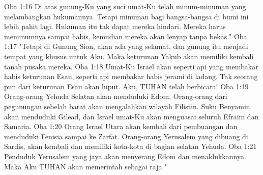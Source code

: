 Oba 1:16  Di atas gunung-Ku yang suci umat-Ku telah minum-minuman yang melambangkan hukumannya. Tetapi minuman bagi bangsa-bangsa di bumi ini lebih pahit lagi. Hukuman itu tak dapat mereka hindari. Mereka harus meminumnya sampai habis, kemudian mereka akan lenyap tanpa bekas."
Oba 1:17  "Tetapi di Gunung Sion, akan ada yang selamat, dan gunung itu menjadi tempat yang khusus untuk Aku. Maka keturunan Yakub akan memiliki kembali tanah pusaka mereka.
Oba 1:18  Umat-Ku Israel akan seperti api yang membakar habis keturunan Esau, seperti api membakar habis jerami di ladang. Tak seorang pun dari keturunan Esau akan luput. Aku, TUHAN telah berbicara!
Oba 1:19  Orang-orang Yehuda Selatan akan menduduki Edom. Orang-orang dari pegunungan sebelah barat akan mengalahkan wilayah Filistin. Suku Benyamin akan menduduki Gilead, dan Israel umat-Ku akan menguasai seluruh Efraim dan Samaria.
Oba 1:20  Orang Israel Utara akan kembali dari pembuangan dan menduduki Fenisia sampai ke Zarfat. Orang-orang Yerusalem yang dibuang di Sardis, akan kembali dan memiliki kota-kota di bagian selatan Yehuda.
Oba 1:21  Penduduk Yerusalem yang jaya akan menyerang Edom dan menaklukkannya. Maka Aku TUHAN akan memerintah sebagai raja."


